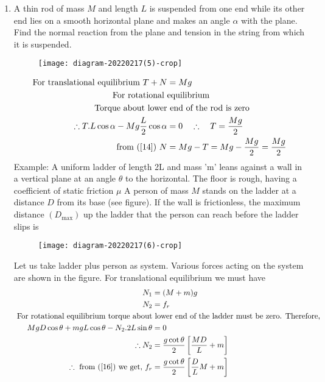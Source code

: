 \begin{enumerate}
\begin{answer}
\end{answer}
\item A thin rod of mass $M$ and length $L$ is suspended from one end while its other end lies on a smooth horizontal plane and makes an angle $\alpha$ with the plane. Find the normal reaction from the plane and tension in the string from which it is suspended.
\begin{figure}[H]
	\centering
	\texttt{[image: diagram-20220217(5)-crop]}
\end{figure}
\begin{align}
\text{For translational equilibrium }T+N&=M g \label{14}\\
\text{For rotational }&\text{equilibrium }\notag\\
\text{Torque about lower}&\text{ end of the rod is zero}\notag\\
	\therefore T . L \cos \alpha-M g \frac{L}{2} \cos \alpha&=0 \quad \therefore \quad T=\frac{M g}{2}\notag\\
	\text{from (\ref{14}) }N&=M g-T=M g-\frac{M g}{2}=\frac{M g}{2}\notag
\end{align}
Example: A uniform ladder of length 2L and mass 'm' leans against a wall in a vertical plane at an angle $\theta$ to the horizontal. The floor is rough, having a coefficient of static friction $\mu$
A person of mass $M$ stands on the ladder at a distance $D$ from its base (see figure). If the wall is frictionless, the maximum distance $\left(D_{\max }\right)$ up the ladder that the person can reach before the ladder slips is
\begin{figure}[H]
	\centering
	\texttt{[image: diagram-20220217(6)-crop]}
\end{figure}
\begin{answer}
	Let us take ladder plus person as system. Various forces acting on the system are shown in the figure. For translational equilibrium we must have
	\begin{align}
	N_{1}&=(M+m) g\label{15}\\
	N_{2}&=f_{r}\label{16}\\
	\text{	For rotational equilibrium torque about}&\text{ lower end of the ladder must be zero. Therefore,}\notag\\
	M g D \cos \theta+m g L \cos \theta-N_{2} .2 L \sin \theta&=0\notag\\
	\therefore N_{2}&=\frac{g \cot \theta}{2}\left[\frac{M D}{L}+m\right]\notag\\
	\therefore\text{ from (\ref{16}) we get, }f_{r}&=\frac{g \cot \theta}{2}\left[\frac{D}{L} M+m\right]\notag\\

\end{align}
\end{answer}
\end{enumerate}
